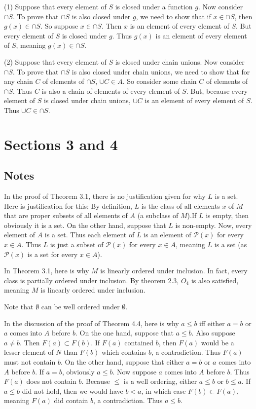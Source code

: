 \documentclass{article}
\theoremstyle{definition}
\begin{document}
(1) Suppose that every element of $S$ is closed under a function $g$. Now consider $\cap S$. To prove that $\cap S$ is also closed under $g$, we need to show that 
if $x\in\cap S$, then $g(x)\in\cap S$. So suppose $x\in\cap S$. Then $x$ is an element of every element of $S$. But every element of $S$ is closed under $g$. 
Thus $g(x)$ is an element of every element of $S$, meaning $g(x)\in\cap S$.

(2) Suppose that every element of $S$ is closed under chain unions. Now consider $\cap S$. To prove that $\cap S$ is also closed under chain unions, we need to show 
that for any chain $C$ of elements of $\cap S$, $\cup C\in A$. So consider some chain $C$ of elements of $\cap S$. Thus $C$ is also a chain of elements of every element of 
$S$. But, because every element of $S$ is closed under chain unions, $\cup C$ is an element of every element of $S$. Thus $\cup C\in\cap S$. 

\section*{Sections 3 and 4}

\subsection*{Notes}

In the proof of Theorem 3.1, there is no justification given for why $L$ is a set. Here is justification for this: By definition, $L$ is the class of all elements $x$ of 
$M$ that are proper subsets of all elements of $A$ (a subclass of $M$).If $L$ is empty, then obviously it is a set. On the other hand, suppose that $L$ 
is non-empty. Now, every element of $A$ is a set. Thus each element of $L$ is an element of 
$\mathcal{P}(x)$ for every $x\in A$. Thus $L$ is just a subset of $\mathcal{P}(x)$ for every $x\in A$, meaning $L$ is a set (as $\mathcal{P}(x)$ is a set 
for every $x\in A$).

In Theorem 3.1, here is why $M$ is linearly ordered under inclusion. In fact, every class is partially ordered under inclusion. By theorem 2.3, $O_4$ is also satisfied, 
meaning $M$ is linearly ordered under inclusion.

Note that $\emptyset$ can be well ordered under $\emptyset$.

In the discussion of the proof of Theorem 4.4, here is why $a\le b$ iff either $a=b$ or $a$ comes into $A$ before $b$. On the one hand, suppose that $a\le b$. Also suppose $a\ne b$. 
Then $F(a)\subset F(b)$. If $F(a)$ contained $b$, then $F(a)$ would be a lesser element of $N$ than $F(b)$ which contains $b$, a contradiction. Thus $F(a)$ must not contain $b$. On 
the other hand, suppose that either $a=b$ or $a$ comes into $A$ before $b$. If $a=b$, obviously $a\le b$. Now suppose $a$ comes into $A$ before $b$. 
Thus $F(a)$ does not contain $b$. Because $\le$ is a well ordering, either $a\le b$ or $b\le a$. If $a\le b$ did not hold, then we would have 
$b<a$, in which case $F(b)\subset F(a)$, meaning $F(a)$ did contain $b$, a contradiction. Thus $a\le b$.
\end{document}
